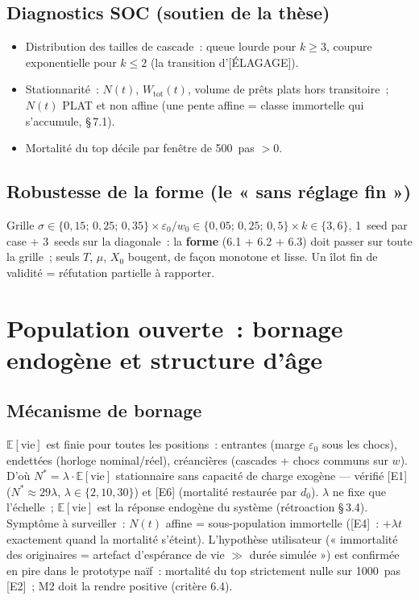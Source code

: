 \documentclass[11pt,a4paper]{article}
\begin{document}
\subsection{Diagnostics SOC (soutien de la thèse)}
\label{sec:diagnostics-soc}

\begin{itemize}
  \item Distribution des tailles de cascade~: queue lourde pour $k\geq 3$, coupure exponentielle pour $k\leq 2$ (la transition d'[ÉLAGAGE]).
  \item Stationnarité~: $N(t)$, $W_{\mathrm{tot}}(t)$, volume de prêts plats hors transitoire~; $N(t)$ PLAT et non affine (une pente affine = classe immortelle qui s'accumule, \S\,7.1).
  \item Mortalité du top décile par fenêtre de 500~pas $>0$.
\end{itemize}

\subsection{Robustesse de la forme (le « sans réglage fin »)}
\label{sec:robustesse}

Grille $\sigma\in\{0{,}15;\,0{,}25;\,0{,}35\} \times \varepsilon_0/w_0\in\{0{,}05;\,0{,}25;\,0{,}5\} \times k\in\{3,6\}$, 1~seed par case + 3~seeds sur la diagonale~: la \textbf{forme} (6.1 + 6.2 + 6.3) doit passer sur toute la grille~; seuls $T$, $\mu$, $X_0$ bougent, de façon monotone et lisse. Un îlot fin de validité = réfutation partielle à rapporter.

\section{Population ouverte~: bornage endogène et structure d'âge}
\label{sec:population-ouverte}

\subsection{Mécanisme de bornage}
\label{sec:bornage}

$\mathbb E[\text{vie}]$ est finie pour toutes les positions~: entrantes (marge $\varepsilon_0$ sous les chocs), endettées (horloge nominal/réel), créancières (cascades + chocs communs sur $w$). D'où $N^*=\lambda\cdot\mathbb E[\text{vie}]$ stationnaire sans capacité de charge exogène --- vérifié [E1] ($N^*\approx 29\lambda$, $\lambda\in\{2,10,30\}$) et [E6] (mortalité restaurée par $d_0$). $\lambda$ ne fixe que l'échelle~; $\mathbb E[\text{vie}]$ est la réponse endogène du système (rétroaction \S\,3.4). Symptôme à surveiller~: $N(t)$ affine = sous-population immortelle ([E4]~: $+\lambda t$ exactement quand la mortalité s'éteint). L'hypothèse utilisateur (« immortalité des originaires = artefact d'espérance de vie $\gg$ durée simulée ») est confirmée en pire dans le prototype naïf~: mortalité du top strictement nulle sur 1000~pas [E2]~; M2 doit la rendre positive (critère 6.4).
\end{document}
